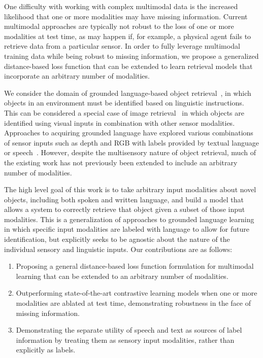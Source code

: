 \documentclass[sigconf,natbib=true,anonymous=true]{acmart}
\begin{document}
One difficulty with working with complex multimodal data is the increased likelihood that one or more modalities may have missing information. Current multimodal approaches are typically not robust to the loss of one or more modalities at test time, as may happen if, for example, a physical agent fails to retrieve data from a particular sensor. In order to fully leverage multimodal training data while being robust to missing information, we propose a generalized distance-based loss function that can be extended to learn retrieval models that incorporate an arbitrary number of modalities.

We consider the domain of grounded language-based object retrieval~\cite{hu2016natural, triplet_loss_2021_CVPR}, in which objects in an environment must be identified based on linguistic instructions. This can be considered a special case of image retrieval~\cite{huang2017deep, ma2020large, novak2015large, vo2019composing} in which objects are identified using visual inputs in combination with other sensor modalities. Approaches to acquiring grounded language have explored various combinations of sensor inputs such as depth and RGB with labels provided by textual language or  speech~\cite{RichardsDarvishMatuszekCategoryFree20}. 
However, despite the multisensory nature of object retrieval, much of the existing work has not previously been extended to include an arbitrary number of modalities. 

The high level goal of this work is to take arbitrary input modalities about novel objects, including both spoken and written language, and build a model that allows a system to correctly retrieve that object given a subset of those input modalities. This is a generalization of approaches to grounded language learning in which specific input modalities are labeled with language to allow for future identification, but explicitly seeks to be agnostic about the nature of the individual sensory and linguistic inputs. Our contributions are as follows:
\begin{enumerate}
    \item Proposing a general distance-based loss function formulation for multimodal learning that can be extended to an arbitrary number of modalities.
    \item Outperforming state-of-the-art contrastive learning models when one or more modalities are ablated at test time, demonstrating robustness in the face of missing information.
    \item Demonstrating the separate utility of speech and text as sources of label information by treating them as sensory input modalities, rather than explicitly as labels.
\end{enumerate}
\end{document}
